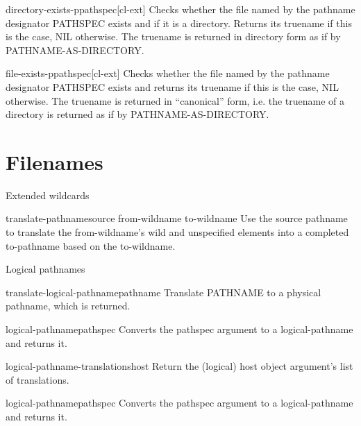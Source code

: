 \documentclass[10pt,english]{book}
\begin{document}
\begin{function}{directory-exists-p}{pathspec}[cl-ext]
  Checks whether the file named by the pathname designator PATHSPEC
  exists and if it is a directory. Returns its truename if this is the
  case, NIL otherwise. The truename is returned in directory form as
  if by PATHNAME-AS-DIRECTORY.
\end{function}

\begin{function}{file-exists-p}{pathspec}[cl-ext]
  Checks whether the file named by the pathname designator PATHSPEC
  exists and returns its truename if this is the case, NIL otherwise.
  The truename is returned in ``canonical'' form, i.e. the truename of
  a directory is returned as if by PATHNAME-AS-DIRECTORY.
\end{function}

\section{Filenames}
\label{sec:filenames}

Extended wildcards

\begin{function}{translate-pathname}{source from-wildname to-wildname \key}
  Use the source pathname to translate the from-wildname's wild and
   unspecified elements into a completed to-pathname based on the to-wildname.
\end{function}

Logical pathnames

\begin{function}{translate-logical-pathname}{pathname \key}
  Translate PATHNAME to a physical pathname, which is returned.
\end{function}

\begin{class}{logical-pathname}{pathspec}
  Converts the pathspec argument to a logical-pathname and returns it.
\end{class}

\begin{accessor}{logical-pathname-translations}{host}
  Return the (logical) host object argument's list of translations.
\end{accessor}

\begin{function}{logical-pathname}{pathspec}
  Converts the pathspec argument to a logical-pathname and returns it.
\end{function}
\end{document}
